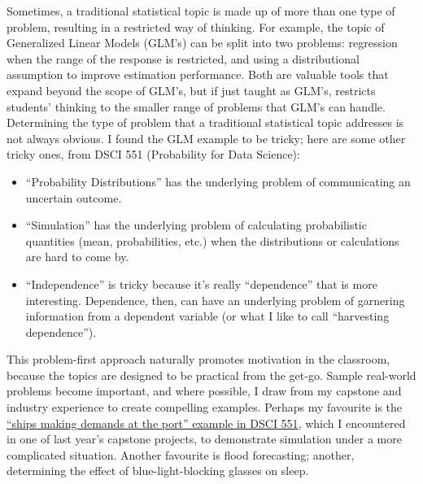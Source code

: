 \documentclass[]{article}
\providecommand{\tightlist}{%
  \setlength{\itemsep}{0pt}\setlength{\parskip}{0pt}}
\begin{document}
Sometimes, a traditional statistical topic is made up of more than one type of problem, resulting in a restricted way of thinking. For example, the topic of Generalized Linear Models (GLM's) can be split into two problems: regression when the range of the response is restricted, and using a distributional assumption to improve estimation performance. Both are valuable tools that expand beyond the scope of GLM's, but if just taught as GLM's, restricts students' thinking to the smaller range of problems that GLM's can handle.
Determining the type of problem that a traditional statistical topic addresses is not always obvious. I found the GLM example to be tricky; here are some other tricky ones, from DSCI 551 (Probability for Data Science):

\begin{itemize}
\tightlist
\item
  ``Probability Distributions'' has the underlying problem of communicating an uncertain outcome.
\item
  ``Simulation'' has the underlying problem of calculating probabilistic quantities (mean, probabilities, etc.) when the distributions or calculations are hard to come by.
\item
  ``Independence'' is tricky because it's really ``dependence'' that is more interesting. Dependence, then, can have an underlying problem of garnering information from a dependent variable (or what I like to call ``harvesting dependence'').
\end{itemize}

This problem-first approach naturally promotes motivation in the classroom, because the topics are designed to be practical from the get-go. Sample real-world problems become important, and where possible, I draw from my capstone and industry experience to create compelling examples. Perhaps my favourite is the \href{https://ubc-mds.github.io/DSCI_551_stat-prob-dsci/lectures/simulation.html\#multi-step-simulations-10-min}{``ships making demands at the port'' example in DSCI 551}, which I encountered in one of last year's capstone projects, to demonstrate simulation under a more complicated situation. Another favourite is flood forecasting; another, determining the effect of blue-light-blocking glasses on sleep.
\end{document}
